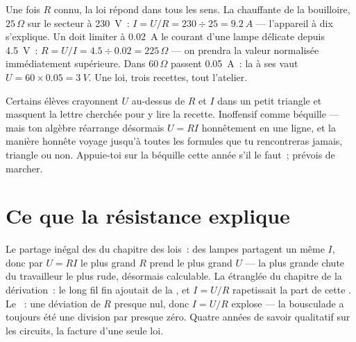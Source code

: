 \begin{example}\label{ex:g8:ohms-law:compute}
Une fois $R$ connu, la loi répond dans tous les sens. La 
chauffante de la bouilloire, $25\,\Omega$ sur le secteur à
\qty{230}{V}~: $I = U/R = 230 \div 25 = \qty{9.2}{A}$ --- l'appareil
à dix  s'explique. Un  doit limiter à \qty{0.02}{A} le
courant d'une lampe délicate depuis \qty{4.5}{V}~:
$R = U/I = 4.5 \div 0.02 = 225\,\Omega$ --- on prendra la valeur
normalisée immédiatement supérieure. Dans $60\,\Omega$ passent
\qty{0.05}{A}~: la  à ses  vaut
$U = 60 \times 0.05 = \qty{3}{V}$. Une loi, trois recettes, tout
l'atelier.
\end{example}

\begin{remark}\label{rem:g8:ohms-law:triangle}
Certains élèves crayonnent $U$ au-dessus de $R$ et $I$ dans un petit
triangle et masquent la lettre cherchée pour y lire la recette.
Inoffensif comme béquille --- mais ton algèbre réarrange désormais
$U = R I$ honnêtement en une ligne, et la manière honnête voyage
jusqu'à toutes les formules que tu rencontreras jamais, triangle ou
non. Appuie-toi sur la béquille cette année s'il le faut~; prévois de
marcher.
\end{remark}

\section{Ce que la résistance explique}

\begin{example}\label{ex:g8:ohms-law:mysteries}
Le partage inégal des  du chapitre des lois~: des lampes  partagent un même $I$, donc par $U = R I$ le plus grand $R$
prend le plus grand $U$ --- la plus grande chute du travailleur le
plus rude, désormais calculable. La  étranglée du chapitre de
la dérivation~: le long fil fin ajoutait de la , et
$I = U/R$ rapetissait la part de cette . Le ~:
une déviation de $R$ presque nul, donc $I = U/R$ explose --- la
bousculade a toujours été une division par presque zéro. Quatre
années de savoir qualitatif sur les circuits, la facture d'une seule
loi.
\end{example}

